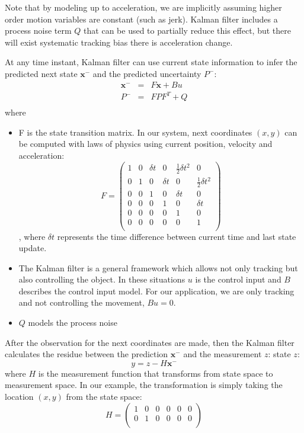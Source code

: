 Note that by modeling up to acceleration, we are implicitly assuming higher order motion variables are constant (such as jerk). Kalman filter includes a process noise term $Q$ that can be used to partially reduce this effect, but there will exist systematic tracking bias there is acceleration change.

At any time instant, Kalman filter can use current state information to infer the predicted next state $\mathbf{x}^-$ and the predicted uncertainty $P^-$:
\begin{eqnarray}
\mathbf{x}^- & = &F \mathbf{x} + Bu\\
P^- & = & FPF^T + Q\\
\end{eqnarray}
where
\begin{itemize}
\item F is the state transition matrix. In our system, next coordinates $(x,y)$ can be computed with laws of physics using current position, velocity and acceleration:
\[
F  =  \left(\begin{array}{cccccc}
1 & 0 & \delta t & 0 & \frac{1}{2}\delta t^2 & 0 \\
0 & 1 & 0 & \delta t & 0 & \frac{1}{2} \delta t^2 \\
0 & 0 & 1 & 0 & \delta t & 0\\
0 & 0 & 0 & 1 & 0 & \delta t\\
0 & 0 & 0 & 0 & 1 & 0 \\
0 & 0 & 0 & 0 & 0 & 1 \\
\end{array}\right)
\], where $\delta t$ represents the time difference between current time and last state update. 
\item The Kalman filter is a general framework which allows not only tracking but also controlling the object. In these situations $u$ is the control input and $B$ describes the control input model. For our application, we are only tracking and not controlling the movement, $Bu = 0$.
\item $Q$ models the process noise
\end{itemize}

After the observation for the next coordinates are made, then the Kalman filter calculates the residue between the prediction $\mathbf{x}^-$ and the measurement $z$:
state $z$:
\[
y = z - H\mathbf{x}^-
\]
where $H$ is the measurement function that transforms from state space to measurement space. In our example, the transformation is simply taking the location $(x,y)$ from the state space:
\[
H = \left(\begin{array}{cccccc}
1 & 0 & 0 & 0 & 0 & 0 \\
0 & 1 & 0 & 0 & 0 & 0 \\
\end{array}\right)
\]


